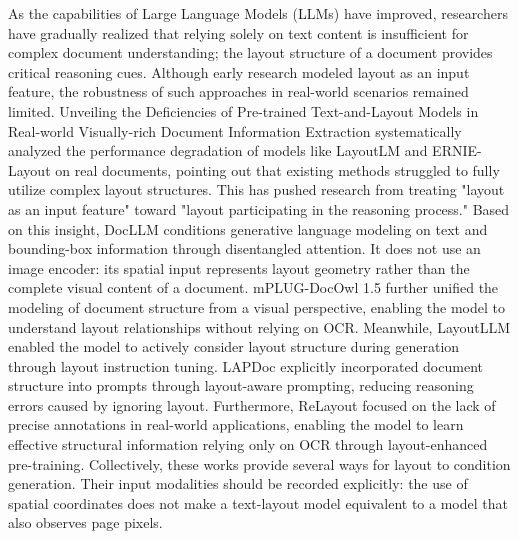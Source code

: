 As the capabilities of Large Language Models (LLMs) have improved, researchers have gradually realized that relying solely on text content is insufficient for complex document understanding; the layout structure of a document provides critical reasoning cues. Although early research modeled layout as an input feature, the robustness of such approaches in real-world scenarios remained limited. Unveiling the Deficiencies of Pre-trained Text-and-Layout Models in Real-world Visually-rich Document Information Extraction \cite{zhang2024unveiling} systematically analyzed the performance degradation of models like LayoutLM and ERNIE-Layout on real documents, pointing out that existing methods struggled to fully utilize complex layout structures. This has pushed research from treating "layout as an input feature" toward "layout participating in the reasoning process." Based on this insight, DocLLM \cite{wang2024docllm} conditions generative language modeling on text and bounding-box information through disentangled attention. It does not use an image encoder: its spatial input represents layout geometry rather than the complete visual content of a document. mPLUG-DocOwl 1.5 \cite{hu2024mplugdocowl15} further unified the modeling of document structure from a visual perspective, enabling the model to understand layout relationships without relying on OCR. Meanwhile, LayoutLLM \cite{luo2024layoutllm} enabled the model to actively consider layout structure during generation through layout instruction tuning. LAPDoc \cite{lamott2024lapdoc} explicitly incorporated document structure into prompts through layout-aware prompting, reducing reasoning errors caused by ignoring layout. Furthermore, ReLayout \cite{relayout2024} focused on the lack of precise annotations in real-world applications, enabling the model to learn effective structural information relying only on OCR through layout-enhanced pre-training. Collectively, these works provide several ways for layout to condition generation. Their input modalities should be recorded explicitly: the use of spatial coordinates does not make a text-layout model equivalent to a model that also observes page pixels.

